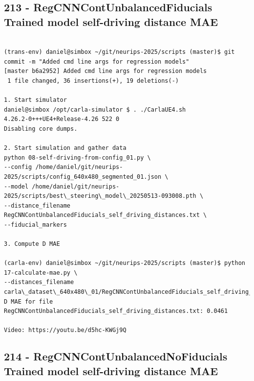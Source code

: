 \subsection{213 - RegCNNContUnbalancedFiducials Trained model self-driving distance MAE}
\label{app_res:213}

\begin{verbatim}

(trans-env) daniel@simbox ~/git/neurips-2025/scripts (master)$ git commit -m "Added cmd line args for regression models"
[master b6a2952] Added cmd line args for regression models
 1 file changed, 36 insertions(+), 19 deletions(-)

1. Start simulator
daniel@simbox /opt/carla-simulator $ . ./CarlaUE4.sh 
4.26.2-0+++UE4+Release-4.26 522 0
Disabling core dumps.

2. Start simulation and gather data
python 08-self-driving-from-config_01.py \
--config /home/daniel/git/neurips-2025/scripts/config_640x480_segmented_01.json \
--model /home/daniel/git/neurips-2025/scripts/best\_steering\_model\_20250513-093008.pth \
--distance_filename RegCNNContUnbalancedFiducials_self_driving_distances.txt \
--fiducial_markers

3. Compute D MAE

(carla-env) daniel@simbox ~/git/neurips-2025/scripts (master)$ python 17-calculate-mae.py \
--distances_filename carla\_dataset\_640x480\_01/RegCNNContUnbalancedFiducials_self_driving_distances.txt
D MAE for file RegCNNContUnbalancedFiducials_self_driving_distances.txt: 0.0461

Video: https://youtu.be/d5hc-KWGj9Q
\end{verbatim}

\subsection{214 - RegCNNContUnbalancedNoFiducials Trained model self-driving distance MAE}
\label{app_res:214}

